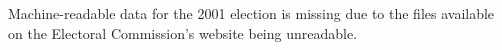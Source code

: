 Machine-readable data for the 2001 election is missing due to the files
available on the Electoral Commission's website being unreadable.